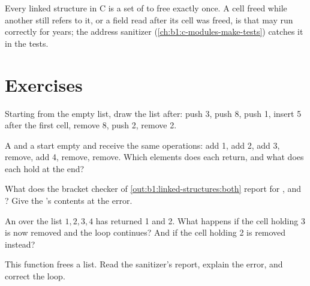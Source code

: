 \begin{safety}
Every linked structure in C is a set of  to free exactly once. A cell freed while another  still refers to
it, or a  field read after its cell was freed, is  that may run correctly for years; the
address sanitizer (\cref{ch:b1:c-modules-make-tests}) catches it in the tests.
\end{safety}

\section{Exercises}\label{sec:b1:linked-structures:exercises}

\begin{exercise}[$\star$]\label{exo:b1:linked-structures:1}
Starting from the empty list, draw the list after: push 3, push 8, push 1, insert 5 after the first cell, remove 8, push
2, remove 2.
\end{exercise}

\begin{exercise}[$\star$]\label{exo:b1:linked-structures:2}
A  and a  start empty and receive the same operations: add 1, add 2, add 3, remove, add 4, remove, remove.
Which elements does each return, and what does each hold at the end?
\end{exercise}

\begin{exercise}[$\star$]\label{exo:b1:linked-structures:3}
What does the bracket checker of \cref{out:b1:linked-structures:both} report for , \code{{}[]()} and
\code{]}? Give the 's contents at the error.
\end{exercise}

\begin{exercise}[$\star$]\label{exo:b1:linked-structures:4}
An  over the list $1, 2, 3, 4$ has returned 1 and 2. What happens if the cell holding 3 is now removed and the
loop continues? And if the cell holding 2 is removed instead?
\end{exercise}

\begin{exercise}[$\star\star$]\label{exo:b1:linked-structures:5}
This function frees a list. Read the sanitizer's report, explain the error, and correct the loop.
\end{exercise}

